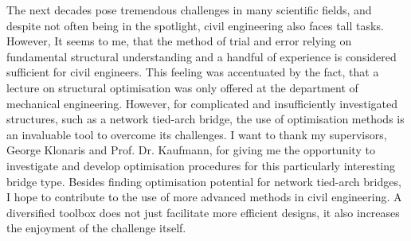 The next decades pose tremendous challenges in many scientific fields, and despite not often being in the spotlight, civil engineering also faces tall tasks. However, It seems to me, that the method of trial and error relying on fundamental structural understanding and a handful of experience is considered sufficient for civil engineers. This feeling was accentuated by the fact, that a lecture on structural optimisation was only offered at the department of mechanical engineering. However, for complicated and insufficiently investigated structures, such as a network tied-arch bridge, the use of optimisation methods is an invaluable tool to overcome its challenges. I want to thank my supervisors, George Klonaris and Prof. Dr. Kaufmann, for giving me the opportunity to investigate and develop optimisation procedures for this particularly interesting bridge type. Besides finding optimisation potential for network tied-arch bridges, I hope to contribute to the use of more advanced methods in civil engineering. A diversified toolbox does not just facilitate more efficient designs, it also increases the enjoyment of the challenge itself.